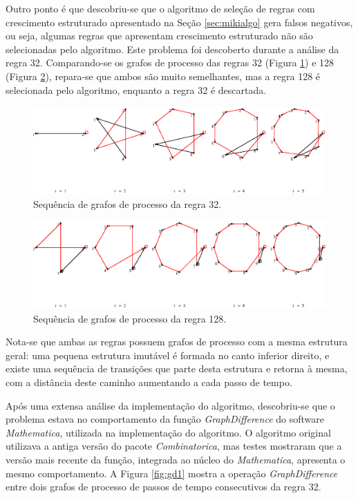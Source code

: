 \documentclass[12pt,a4paper]{article}
\begin{document}
Outro ponto é que descobriu-se que o algoritmo de seleção de regras com
crescimento estruturado apresentado na Seção \ref{sec:mikialgo} gera falsos
negativos, ou seja, algumas regras que apresentam crescimento estruturado
não são selecionadas pelo algoritmo. Este problema foi descoberto durante
a análise da regra 32. Comparando-se os grafos de processo das regras
32 (Figura \ref{fig:r32t}) e 128 (Figura \ref{fig:r128t}), repara-se que
ambos são muito semelhantes, mas a regra 128 é selecionada pelo algoritmo,
enquanto a regra 32 é descartada.

\begin{figure}[htp]
\begin{center}
\includegraphics[scale=1.0]{img/Rule32.eps}
\caption{Sequência de grafos de processo da regra 32.}
\label{fig:r32t}
\end{center}
\end{figure}

\begin{figure}[htp]
\begin{center}
\includegraphics[scale=1.0]{img/Rule128.eps}
\caption{Sequência de grafos de processo da regra 128.}
\label{fig:r128t}
\end{center}
\end{figure}

Nota-se que ambas as regras possuem grafos de processo com a mesma estrutura geral:
uma pequena estrutura imutável é formada no canto inferior direito, e existe
uma sequência de transições que parte desta estrutura e retorna à mesma, com
a distância deste caminho aumentando a cada passo de tempo.

Após uma extensa análise da implementação do algoritmo, descobriu-se que o
problema estava no comportamento da função \textit{GraphDifference} do
software \textit{Mathematica}, utilizada na implementação do algoritmo.
O algoritmo original utilizava a antiga versão do pacote
\textit{Combinatorica}, mas testes mostraram que a versão mais recente da
função, integrada ao núcleo do \textit{Mathematica}, apresenta o mesmo
comportamento. A Figura \ref{fig:gd1} mostra a operação
\textit{GraphDifference} entre dois grafos de processo de passos de tempo
consecutivos da regra 32.
\end{document}
